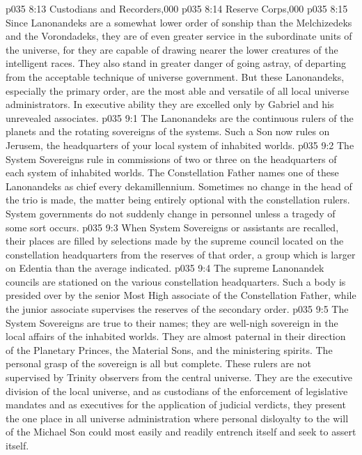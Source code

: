 \vs p035 8:13 Custodians and Recorders,000
\vs p035 8:14 Reserve Corps,000
\vs p035 8:15 \pc Since Lanonandeks are a somewhat lower order of sonship than the Melchizedeks and the Vorondadeks, they are of even greater service in the subordinate units of the universe, for they are capable of drawing nearer the lower creatures of the intelligent races. They also stand in greater danger of going astray, of departing from the acceptable technique of universe government. But these Lanonandeks, especially the primary order, are the most able and versatile of all local universe administrators. In executive ability they are excelled only by Gabriel and his unrevealed associates.
\vs p035 9:1 The Lanonandeks are the continuous rulers of the planets and the rotating sovereigns of the systems. Such a Son now rules on Jerusem, the headquarters of your local system of inhabited worlds.
\vs p035 9:2 The System Sovereigns rule in commissions of two or three on the headquarters of each system of inhabited worlds. The Constellation Father names one of these Lanonandeks as chief every dekamillennium. Sometimes no change in the head of the trio is made, the matter being entirely optional with the constellation rulers. System governments do not suddenly change in personnel unless a tragedy of some sort occurs.
\vs p035 9:3 When System Sovereigns or assistants are recalled, their places are filled by selections made by the supreme council located on the constellation headquarters from the reserves of that order, a group which is larger on Edentia than the average indicated.
\vs p035 9:4 The supreme Lanonandek councils are stationed on the various constellation headquarters. Such a body is presided over by the senior Most High associate of the Constellation Father, while the junior associate supervises the reserves of the secondary order.
\vs p035 9:5 \pc The System Sovereigns are true to their names; they are well\hyp{}nigh sovereign in the local affairs of the inhabited worlds. They are almost paternal in their direction of the Planetary Princes, the Material Sons, and the ministering spirits. The personal grasp of the sovereign is all but complete. These rulers are not supervised by Trinity observers from the central universe. They are the executive division of the local universe, and as custodians of the enforcement of legislative mandates and as executives for the application of judicial verdicts, they present the one place in all universe administration where personal disloyalty to the will of the Michael Son could most easily and readily entrench itself and seek to assert itself.
